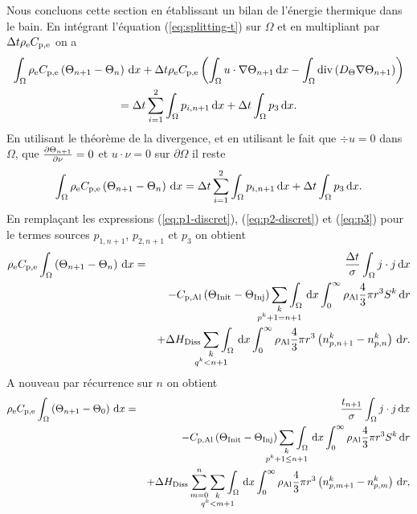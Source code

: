 Nous concluons cette section en établissant un bilan de l'énergie
thermique dans le bain. En intégrant l'équation (\ref{eq:splitting-t})
sur $\Omega$ et en multipliant par $\Delta t\rho_\mathrm{e}C_{\mathrm{p,e}}$
on a
\begin{multline}
\int_\Omega\rho_\mathrm{e}C_{\mathrm{p,e}}\left( \Theta_{n+1}
- \Theta_n \right)\,\mathrm dx
+\Delta t\rho_\mathrm{e}C_{\mathrm{p,e}}\left( \int_\Omega
  u\cdot\nabla\Theta_{n+1}\,\mathrm dx - \int_\Omega
  \mathrm{div}\left( D_\Theta\nabla\Theta_{n+1} \right) \right) \\
= \Delta t\sum_{i=1}^2\int_\Omega p_{i,n+1}\,\mathrm dx + \Delta t\int_\Omega p_3\,\mathrm dx.
\end{multline}
En utilisant le théorème de la divergence, et en utilisant le fait que
$\div u = 0$ dans $\Omega$, que $\frac{\partial
  \Theta_{n+1}}{\partial \nu} = 0$ et $u\cdot \nu = 0$ sur
$\partial \Omega$ il reste
\begin{equation}
  \int_\Omega\rho_\mathrm{e}C_{\mathrm{p,e}}\left( \Theta_{n+1} - \Theta_n \right)\,\mathrm dx = \Delta t\sum_{i=1}^2\int_\Omega p_{i,n+1}\,\mathrm dx + \Delta t\int_\Omega p_3\,\mathrm dx.
\end{equation}
En remplaçant les expressions (\ref{eq:p1-discret}), (\ref{eq:p2-discret}) et (\ref{eq:p3}) pour le termes sources $p_{1,n+1}$, $p_{2,n+1}$ et $p_3$ on obtient
\begin{eqnarray*}
  \electrolytedensity\electrolytehc\int_\Omega\parent{\temperature_{n+1} - \temperature_n}\intd{x} &=& \frac{\dt}{ \conductivity}\int_\Omega j\cdot j\intd{x}\\
  && - \aluminahc\parent{\tinit - \tinj}\sum_{\mathclap{\substack{k\\ p^k + 1 = n+1}}}\int_\Omega\intd{x}\int_0^\infty \aluminadensity \frac{4}{3}\pi r^3 S^k\intd{r}\\
  && + {\aluminadissolutionenthalpy}\sum_{\mathclap{\substack{k\\ q^k < n+1}}} \int_\Omega\intd{x}\int_0^\infty \aluminadensity \frac{4}{3}\pi r^3\parent{n_{p,n+1}^k-n_{p,n}^k}\intd{r}.
\end{eqnarray*}
A nouveau par récurrence sur $n$ on obtient
\begin{eqnarray}
  \electrolytedensity\electrolytehc\int_\Omega\parent{\temperature_{n+1} - \temperature_0}\intd{x} &=& \frac{t_{n+1}}{\conductivity}\int_\Omega j\cdot j\intd{x}\nonumber\\
  && - \aluminahc\parent{\tinit - \tinj}\sum_{\mathclap{\substack{k\\ p^k + 1 \leq n+1}}}\int_\Omega\intd{x}\int_0^\infty \aluminadensity \frac{4}{3}\pi r^3 S^k\intd{r}\nonumber\\
  && + {\aluminadissolutionenthalpy}\sum_{m =
    0}^{n}\sum_{\mathclap{\substack{k\\ q^k < m + 1}}}
  \int_\Omega\intd{x}\int_0^\infty \aluminadensity \frac{4}{3}\pi
  r^3\parent{n_{p,m+1}^k-n_{p,m}^k}\intd{r},\nonumber\\ \label{eq:energy-mass-balance}
\end{eqnarray}

